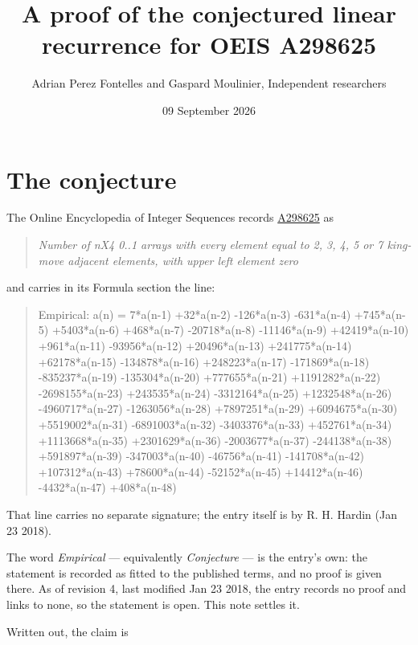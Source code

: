 \documentclass[11pt]{article}
\title{A proof of the conjectured linear recurrence for OEIS A298625}
\author{Adrian Perez Fontelles and Gaspard Moulinier, Independent researchers}
\date{09 September 2026}
\theoremstyle{definition}
\begin{document}
\maketitle
\section{The conjecture}

The Online Encyclopedia of Integer Sequences records \href{https://oeis.org/A298625}{A298625} as

\begin{quote}\itshape Number of nX4 0..1 arrays with every element equal to 2, 3, 4, 5 or 7 king-move adjacent elements, with upper left element zero\end{quote}

and carries in its Formula section the line:

\begin{quote}\ttfamily Empirical: a(n) = 7*a(n-1) +32*a(n-2) -126*a(n-3) -631*a(n-4) +745*a(n-5) +5403*a(n-6) +468*a(n-7) -20718*a(n-8) -11146*a(n-9) +42419*a(n-10) +961*a(n-11) -93956*a(n-12) +20496*a(n-13) +241775*a(n-14) +62178*a(n-15) -134878*a(n-16) +248223*a(n-17) -171869*a(n-18) -835237*a(n-19) -135304*a(n-20) +777655*a(n-21) +1191282*a(n-22) -2698155*a(n-23) +243535*a(n-24) -3312164*a(n-25) +1232548*a(n-26) -4960717*a(n-27) -1263056*a(n-28) +7897251*a(n-29) +6094675*a(n-30) +5519002*a(n-31) -6891003*a(n-32) -3403376*a(n-33) +452761*a(n-34) +1113668*a(n-35) +2301629*a(n-36) -2003677*a(n-37) -244138*a(n-38) +591897*a(n-39) -347003*a(n-40) -46756*a(n-41) -141708*a(n-42) +107312*a(n-43) +78600*a(n-44) -52152*a(n-45) +14412*a(n-46) -4432*a(n-47) +408*a(n-48)\end{quote}

That line carries no separate signature; the entry itself is by R. H. Hardin (Jan 23 2018).

The word {\itshape Empirical} --- equivalently {\itshape Conjecture} --- is the entry's own: the statement is recorded as fitted to the published terms, and no proof is given there. As of revision 4, last modified Jan 23 2018, the entry records no proof and links to none, so the statement is open. This note settles it.

Written out, the claim is
\end{document}
